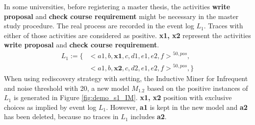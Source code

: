 In some universities, before registering a master thesis, the activities \textbf{write proposal} and \textbf{check course requirement} might be necessary in the master study procedure. The real process are recorded in the event log $L_1$. Traces with either of those activities are considered as positive.  \textbf{x1, x2} represent the activities \textbf{write proposal} and \textbf{check course requirement}.
\begin{align*}
		L_1:= \{ &  {<a1, b, \textbf{x1},c, d1, e1, e2, f>}^{50, pos}, \\   
		  &{<a1, b, \textbf{x2},c, d2, e1, e2, f>}^{50,pos},
		\}
		\end{align*}
When using rediscovery strategy with setting, the Inductive Miner for Infrequent and noise threshold with 20, a new  model $M_{1.2}$ based on the positive instances of $L_1$ is generated in Figure \ref{fig:demo_s1_IM}. \textbf{x1, x2} position with exclusive choices as implied by event log $L_1$. However, \textbf{a1} is kept in the new model and \textbf{a2} has been deleted, because no traces in $L_1$ includes \textbf{a2}.
		
